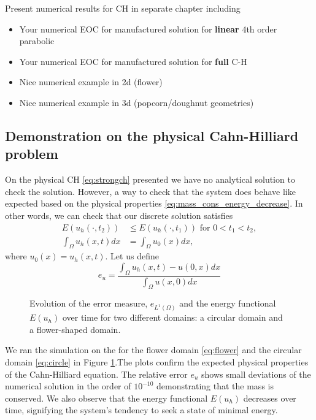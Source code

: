 Present numerical results for CH in separate chapter including
\begin{itemize}
    \item Your numerical EOC for  manufactured solution for \textbf{linear} 4th order parabolic
    \item Your numerical EOC for  manufactured solution for \textbf{full} C-H
    \item Nice numerical example in 2d (flower)
    \item Nice numerical example in 3d (popcorn/doughnut geometries)
\end{itemize}


\subsection{Demonstration on the physical Cahn-Hilliard problem}%
\label{sub:demonstration_on_the_physical_cahn_hilliard}

On the physical CH \eqref{eq:strongch} presented we have no analytical solution to check the solution. However, a way to check that the system does behave like expected based on the physical properties \eqref{eq:mass_cons_energy_decrease}. In other
words, we can check that our discrete solution satisfies \[
    \begin{split}
 E( u_{h}( \cdot , t_{2}) ) & \le  E( u_{h}( \cdot , t_{1}) )   \text{ for } 0 < t_{1} < t_{2},  \\
\int_{\Omega }^{} u_{h} ( x,t)  dx & = \int_{\Omega }^{} u_{0}(x)  dx,
    \end{split}
\]
where $u_{0}( x) = u_{h}( x,t) $. Let us define
\[
 e_{u} = \frac{ \int_{\Omega }^{}  u_h(x,t)- u(0,x) dx}{ \int_{\Omega }^{}  u(x,0) dx}
\]

\begin{figure}[h!]

\caption{Evolution of the error measure, $e_{L^{1}(\Omega)}$ and the energy functional $E(u_h)$ over time for two different domains: a circular domain and a flower-shaped domain.  }
\label{fig:physical_CH_plot}
\end{figure}

We ran the simulation on the for the flower domain \eqref{eq:flower} and the circular domain \eqref{eq:circle} in Figure \ref{fig:physical_CH_plot}.The plots confirm the expected physical properties of the Cahn-Hilliard equation. The relative error $e_{u}$ shows small deviations of the numerical solution in the order of $10^{ -10 }$ demonstrating that the mass is conserved. We also observe that the energy functional
$E(u_h)$ decreases over time, signifying the system's tendency to seek a state of minimal energy.




